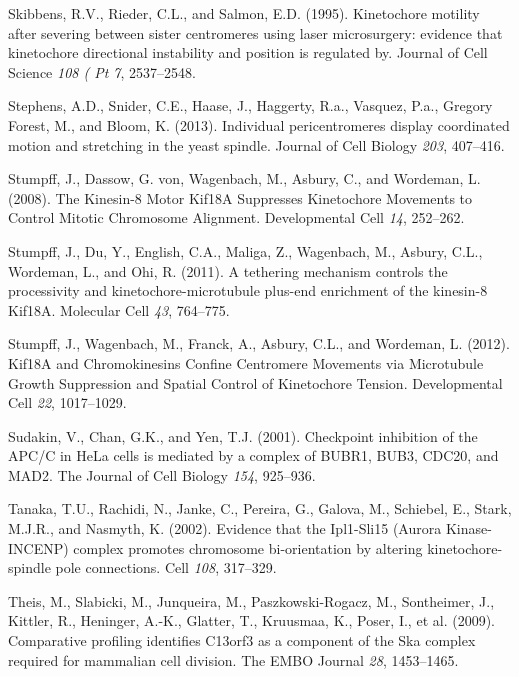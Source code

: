 \documentclass[12pt,a4paper,twoside,openright]{book}
\begin{document}
\hypertarget{ref-Skibbens1995}{}
Skibbens, R.V., Rieder, C.L., and Salmon, E.D. (1995). Kinetochore
motility after severing between sister centromeres using laser
microsurgery: evidence that kinetochore directional instability and
position is regulated by. Journal of Cell Science \emph{108 ( Pt 7},
2537--2548.

\hypertarget{ref-Stephens2013a}{}
Stephens, A.D., Snider, C.E., Haase, J., Haggerty, R.a., Vasquez, P.a.,
Gregory Forest, M., and Bloom, K. (2013). Individual pericentromeres
display coordinated motion and stretching in the yeast spindle. Journal
of Cell Biology \emph{203}, 407--416.

\hypertarget{ref-Stumpff2008}{}
Stumpff, J., Dassow, G. von, Wagenbach, M., Asbury, C., and Wordeman, L.
(2008). The Kinesin-8 Motor Kif18A Suppresses Kinetochore Movements to
Control Mitotic Chromosome Alignment. Developmental Cell \emph{14},
252--262.

\hypertarget{ref-Stumpff2011a}{}
Stumpff, J., Du, Y., English, C.A., Maliga, Z., Wagenbach, M., Asbury,
C.L., Wordeman, L., and Ohi, R. (2011). A tethering mechanism controls
the processivity and kinetochore-microtubule plus-end enrichment of the
kinesin-8 Kif18A. Molecular Cell \emph{43}, 764--775.

\hypertarget{ref-Stumpff2012}{}
Stumpff, J., Wagenbach, M., Franck, A., Asbury, C.L., and Wordeman, L.
(2012). Kif18A and Chromokinesins Confine Centromere Movements via
Microtubule Growth Suppression and Spatial Control of Kinetochore
Tension. Developmental Cell \emph{22}, 1017--1029.

\hypertarget{ref-Sudakin2001}{}
Sudakin, V., Chan, G.K., and Yen, T.J. (2001). Checkpoint inhibition of
the APC/C in HeLa cells is mediated by a complex of BUBR1, BUB3, CDC20,
and MAD2. The Journal of Cell Biology \emph{154}, 925--936.

\hypertarget{ref-Tanaka2002}{}
Tanaka, T.U., Rachidi, N., Janke, C., Pereira, G., Galova, M., Schiebel,
E., Stark, M.J.R., and Nasmyth, K. (2002). Evidence that the Ipl1-Sli15
(Aurora Kinase-INCENP) complex promotes chromosome bi-orientation by
altering kinetochore-spindle pole connections. Cell \emph{108},
317--329.

\hypertarget{ref-Theis2009}{}
Theis, M., Slabicki, M., Junqueira, M., Paszkowski-Rogacz, M.,
Sontheimer, J., Kittler, R., Heninger, A.-K., Glatter, T., Kruusmaa, K.,
Poser, I., et al. (2009). Comparative profiling identifies C13orf3 as a
component of the Ska complex required for mammalian cell division. The
EMBO Journal \emph{28}, 1453--1465.
\end{document}
